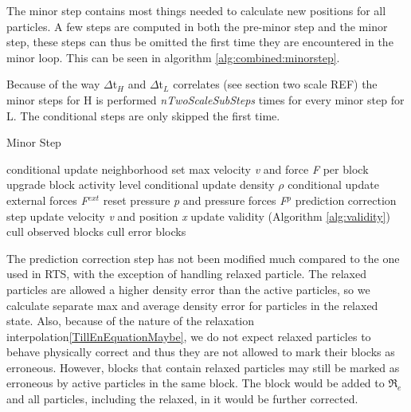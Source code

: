 \documentclass[../../main.tex]{subfiles}
\begin{document}

The minor step contains most things needed to calculate new positions for all particles. A few steps are computed in both the pre-minor step and the minor step, these steps can thus be omitted the first time they are encountered in the minor loop. This can be seen in algorithm \ref{alg:combined:minorstep}. 

Because of the way $\Delta$t$_H$ and $\Delta$t$_L$ correlates (see section two scale REF) the minor steps for H is performed \textit{nTwoScaleSubSteps} times for every minor step for L. The conditional steps are only skipped the first time. 

\begin{algorithm}[h]
    \caption{Minor Step}
    \label{alg:combined:minorstep}
    \begin{algorithmic}[1]
        \State conditional update neighborhood 
        \State set max velocity \textit{v} and force \textit{F} per block
        \State upgrade block activity level
        \State conditional update density $\rho$
        \State conditional update external forces \textit{F}$^{ext}$
    \EndIf
    \State reset pressure \textit{p} and pressure forces \textit{F}$^{p}$
    \State prediction correction step
    \State update velocity \textit{v} and position \textit{x}
    \State update validity (Algorithm \ref{alg:validity})
    \State cull observed blocks
	\State cull error blocks
   \end{algorithmic}
\end{algorithm}

The prediction correction step has not been modified much compared to the one used in RTS, with the exception of handling relaxed particle. The relaxed particles are allowed a higher density error than the active particles, so we calculate separate max and average density error for particles in the relaxed state. Also, because of the nature of the relaxation interpolation\ref{TillEnEquationMaybe}, we do not expect relaxed particles to behave physically correct and thus they are not allowed to mark their blocks as erroneous. However, blocks that contain relaxed particles may still be marked as erroneous by active particles in the same block. The block would be added to $\Re_e$ and all particles, including the relaxed, in it would be further corrected.
\end{document}
